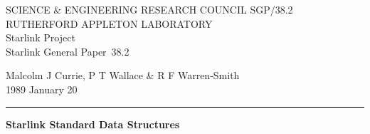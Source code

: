 \documentclass[twoside,11pt]{article}
\newcommand{\stardoccategory}  {Starlink General Paper}
\newcommand{\stardocinitials}  {SGP}
\newcommand{\stardocnumber}    {38.2}
\newcommand{\stardocauthors}   {Malcolm J Currie, P T Wallace \&
                                R F Warren-Smith}
\newcommand{\stardocdate}      {1989 January 20}
\newcommand{\stardoctitle}     {Starlink Standard Data Structures}
\newcommand{\stardocname}{\stardocinitials /\stardocnumber}
\newenvironment{latexonly}{}{}
\begin{document}
\thispagestyle{empty}

\begin{latexonly}
   SCIENCE \& ENGINEERING RESEARCH COUNCIL \hfill \stardocname\\
   RUTHERFORD APPLETON LABORATORY\\
   {\large Starlink Project\\}
   {\large \stardoccategory\ \stardocnumber}
   \begin{flushright}
   \stardocauthors\\
   \stardocdate
   \end{flushright}
   \vspace{-4mm}
   \rule{\textwidth}{0.5mm}
   \vspace{5mm}
   \begin{center}
   {\Large\bf \stardoctitle}
   \end{center}
   \vspace{5mm}

\end{latexonly}
\end{document}
